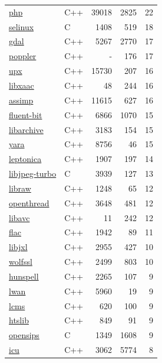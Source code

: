 \begin{table}[p]
\begin{minipage}[t]{.32\textwidth}
{\begin{tabular}[t]{@{}llrrr@{}}
\href{http://php.net/}{php} & C++ & 39018 & 2825 & 22 \\
\href{https://github.com/SELinuxProject/selinux}{selinux} & C & 1408 & 519 & 18 \\
\href{https://gdal.org}{gdal} & C++ & 5267 & 2770 & 17 \\
\href{https://poppler.freedesktop.org/}{poppler} & C++ & - & 176 & 17 \\
\href{https://upx.github.io/}{upx} & C++ & 15730 & 207 & 16 \\
\href{https://github.com/ittiam-systems/libxaac}{libxaac} & C++ & 48 & 244 & 16 \\
\href{https://github.com/assimp/assimp}{assimp} & C++ & 11615 & 627 & 16 \\
\href{https://github.com/fluent/fluent-bit}{fluent-bit} & C++ & 6866 & 1070 & 15 \\
\href{https://github.com/libarchive/libarchive}{libarchive} & C++ & 3183 & 154 & 15 \\
\href{http://virustotal.github.io/yara/}{yara} & C++ & 8756 & 46 & 15 \\
\href{http://www.leptonica.com}{leptonica} & C++ & 1907 & 197 & 14 \\
\href{https://libjpeg-turbo.org}{libjpeg-turbo} & C & 3939 & 127 & 13 \\
\href{https://www.libraw.org/}{libraw} & C++ & 1248 & 65 & 12 \\
\href{https://github.com/openthread/openthread}{openthread} & C++ & 3648 & 481 & 12 \\
\href{https://github.com/ittiam-systems/libavc}{libavc} & C++ & 11 & 242 & 12 \\
\href{https://xiph.org/flac/}{flac} & C++ & 1942 & 89 & 11 \\
\href{https://github.com/libjxl/libjxl}{libjxl} & C++ & 2955 & 427 & 10 \\
\href{https://www.wolfssl.com/}{wolfssl} & C++ & 2499 & 803 & 10 \\
\href{https://hunspell.github.io/}{hunspell} & C++ & 2265 & 107 & 9 \\
\href{https://github.com/lpereira/lwan}{lwan} & C++ & 5960 & 19 & 9 \\
\href{http://www.littlecms.com/}{lcms} & C++ & 620 & 100 & 9 \\
\href{https://www.htslib.org/}{htslib} & C++ & 849 & 91 & 9 \\
\href{https://opensips.org/}{opensips} & C & 1349 & 1608 & 9 \\
\href{https://icu.unicode.org}{icu} & C++ & 3062 & 5774 & 8 \\

\end{tabular}}
\end{minipage}
\end{table}
